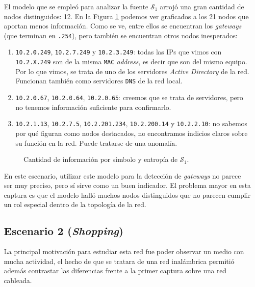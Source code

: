

El modelo que se empleó para analizar la fuente $\mathcal{S}_1$ arrojó una gran cantidad de nodos distinguidos: 12. En la Figura \ref{res:esc1:fig3} podemos ver graficados a los 21 nodos que aportan menos información. Como se ve, entre ellos se encuentran los \emph{gateways} (que terminan en \texttt{.254}), pero también se encuentran otros nodos inesperados:

\begin{enumerate}
\item \texttt{10.2.0.249}, \texttt{10.2.7.249} y \texttt{10.2.3.249}: todas las IPs que vimos con \texttt{10.2.X.249} son de la misma \texttt{MAC} \emph{address}, es decir que son del mismo equipo. Por lo que vimos, se trata de uno de los servidores \emph{Active Directory} de la red. Funcionan también como servidores \texttt{DNS} de la red local.
\item \texttt{10.2.0.67}, \texttt{10.2.0.64}, \texttt{10.2.0.65}: creemos que se trata de servidores, pero no tenemos información suficiente para confirmarlo.
\item \texttt{10.2.1.13}, \texttt{10.2.7.5}, \texttt{10.2.201.234}, \texttt{10.2.200.14} y \texttt{10.2.2.10}: no sabemos por qué figuran como nodos destacados, no encontramos indicios claros sobre su función en la red. Puede tratarse de una anomalía.
\end{enumerate}

\begin{figure}[h]
	\caption{Cantidad de información por símbolo y entropía de $\mathcal{S}_1$.}
    \label{res:esc1:fig3}
\end{figure}


En este escenario, utilizar este modelo para la detección de \emph{gateways} no parece ser muy preciso, pero sí sirve como un buen indicador. El problema mayor en esta captura es que el modelo halló muchos nodos distinguidos que no parecen cumplir un rol especial dentro de la topología de la red.


\subsection{Escenario 2 (\emph{Shopping})}

La principal motivación para estudiar esta red fue poder observar un medio con
mucha actividad, el hecho de que se tratara de una red inalámbrica permitió además
contrastar las diferencias frente a la primer captura sobre una red cableada.

